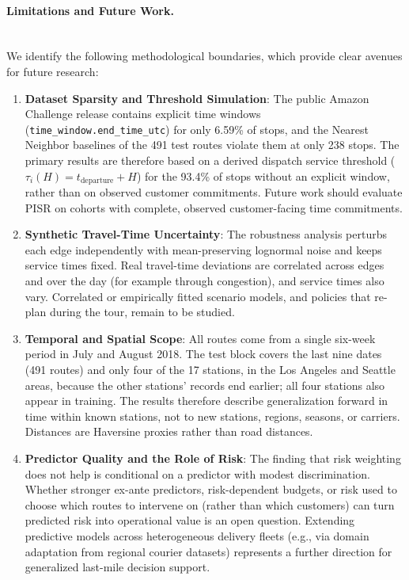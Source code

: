 \documentclass[11pt,a4paper]{article}
\begin{document}
\paragraph{Limitations and Future Work.}\mbox{}\\
We identify the following methodological boundaries, which provide clear avenues for future research:
\begin{enumerate}
    \item \textbf{Dataset Sparsity and Threshold Simulation}: The public Amazon Challenge release contains explicit time windows (\texttt{time\_window.end\_time\_utc}) for only 6.59\% of stops, and the Nearest Neighbor baselines of the 491 test routes violate them at only 238 stops. The primary results are therefore based on a derived dispatch service threshold ($\tau_i(H) = t_{\text{departure}} + H$) for the 93.4\% of stops without an explicit window, rather than on observed customer commitments. Future work should evaluate PISR on cohorts with complete, observed customer-facing time commitments.
    \item \textbf{Synthetic Travel-Time Uncertainty}: The robustness analysis perturbs each edge independently with mean-preserving lognormal noise and keeps service times fixed. Real travel-time deviations are correlated across edges and over the day (for example through congestion), and service times also vary. Correlated or empirically fitted scenario models, and policies that re-plan during the tour, remain to be studied.
    \item \textbf{Temporal and Spatial Scope}: All routes come from a single six-week period in July and August 2018. The test block covers the last nine dates (491 routes) and only four of the 17 stations, in the Los Angeles and Seattle areas, because the other stations' records end earlier; all four stations also appear in training. The results therefore describe generalization forward in time within known stations, not to new stations, regions, seasons, or carriers. Distances are Haversine proxies rather than road distances.
    \item \textbf{Predictor Quality and the Role of Risk}: The finding that risk weighting does not help is conditional on a predictor with modest discrimination. Whether stronger ex-ante predictors, risk-dependent budgets, or risk used to choose which routes to intervene on (rather than which customers) can turn predicted risk into operational value is an open question. Extending predictive models across heterogeneous delivery fleets (e.g., via domain adaptation from regional courier datasets) represents a further direction for generalized last-mile decision support.
\end{enumerate}
\end{document}
